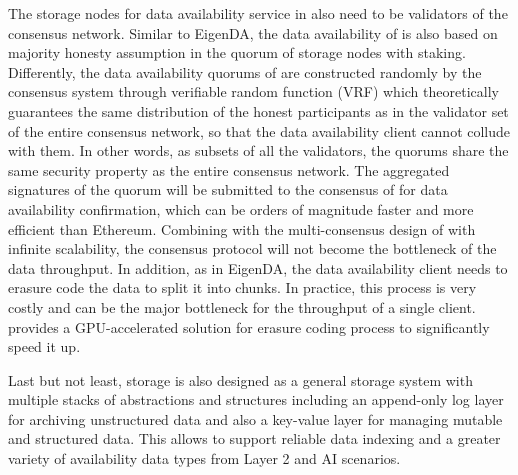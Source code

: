 The storage nodes for data availability service in \projabbrev also need to be validators of the consensus network. Similar to EigenDA, the data availability of \projabbrev is also based on majority honesty assumption in the quorum of storage nodes with staking. Differently, the data availability quorums of \projabbrev are constructed randomly by the consensus system through verifiable random function (VRF) which theoretically guarantees the same distribution of the honest participants as in the validator set of the entire consensus network, so that the data availability client cannot collude with them.
In other words, as subsets of all the validators, the quorums share the same security property as the entire consensus network.
The aggregated signatures of the quorum will be submitted to the consensus of \projabbrev for data availability confirmation, which can be orders of magnitude faster and more efficient than Ethereum. 
Combining with the multi-consensus design of \projabbrev with infinite scalability, the consensus protocol will not become the bottleneck of the data throughput.
In addition, as in EigenDA, the data availability client needs to erasure code the data to split it into chunks. In practice, this process is very costly and can be the major bottleneck for the throughput of a single client. \projabbrev provides a GPU-accelerated solution for erasure coding process to significantly speed it up.   
 

Last but not least, \projabbrev storage is also designed as a general storage system with multiple stacks of abstractions and structures including an append-only log layer for archiving unstructured data and also a key-value layer for managing mutable and structured data. This allows \projabbrev to support reliable data indexing and a greater variety of availability data types from Layer 2 and AI scenarios.  




 

